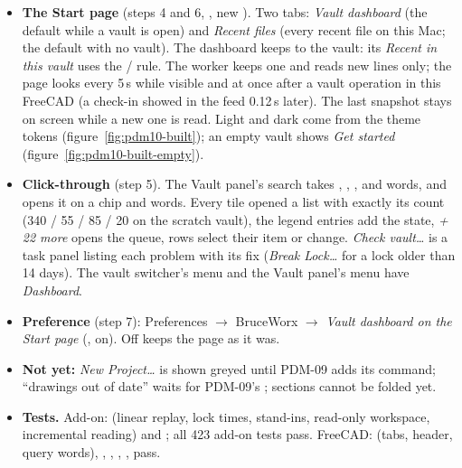 \begin{itemize}[nosep]
        page's data takes about 25\,ms to read and build (test budget 0.1\,s).
  \item \textbf{The Start page} (steps 4 and 6, , new ). Two
        tabs: \emph{Vault dashboard} (the default while a vault is open) and \emph{Recent files} (every recent file on
        this Mac; the default with no vault). The dashboard keeps to the vault: its \emph{Recent in this vault} uses the
        / rule. The worker keeps one  and reads new lines only;
        the page looks every 5\,s while visible and at once after a vault operation in this FreeCAD (a check-in showed
        in the feed 0.12\,s later). The last snapshot stays on screen while a new one is read. Light and dark come
        from the theme tokens (figure~\ref{fig:pdm10-built}); an empty vault shows \emph{Get started}
        (figure~\ref{fig:pdm10-built-empty}).
  \item \textbf{Click-through} (step 5). The Vault panel's search takes , , ,
         and  words, and  opens it on a chip and words. Every tile
        opened a list with exactly its count (340 / 55 / 85 / 20 on the scratch vault), the legend entries add the
        state, \emph{+ 22 more} opens the queue, rows select their item or change. \emph{Check vault\ldots} is a task
        panel listing each problem with its fix (\emph{Break Lock\ldots} for a lock older than 14 days). The vault
        switcher's menu and the Vault panel's menu have \emph{Dashboard}.
  \item \textbf{Preference} (step 7): Preferences $\rightarrow$ BruceWorx $\rightarrow$ \emph{Vault dashboard on the
        Start page} (, on). Off keeps the page as it was.
  \item \textbf{Not yet:} \emph{New Project\ldots} is shown greyed until PDM-09 adds its command; ``drawings out of
        date'' waits for PDM-09's ; sections cannot be folded yet.
  \item \textbf{Tests.} Add-on:  (linear replay, lock times, stand-ins, read-only
        workspace, incremental reading) and ; all 423 add-on tests pass. FreeCAD:
         (tabs, header, query words), , ,
        , ,  pass.
\end{itemize}

